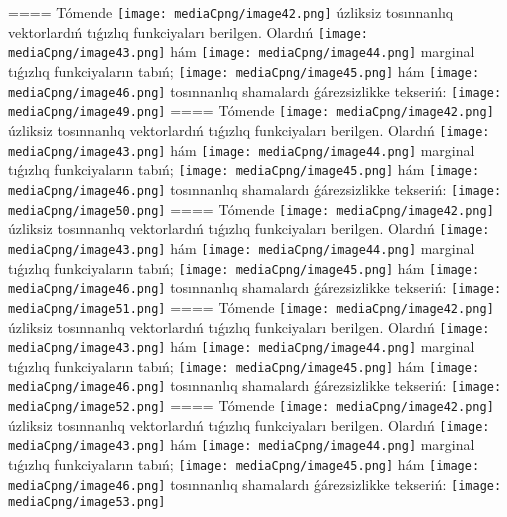 ====
Tómende \texttt{[image: mediaCpng/image42.png]} úzliksiz tosınnanlıq vektorlardıń tıǵızlıq funkciyaları berilgen. Olardıń \texttt{[image: mediaCpng/image43.png]} hám \texttt{[image: mediaCpng/image44.png]} marginal tıǵızlıq funkciyaların tabıń; \texttt{[image: mediaCpng/image45.png]} hám \texttt{[image: mediaCpng/image46.png]} tosınnanlıq shamalardı ǵárezsizlikke tekseriń: \texttt{[image: mediaCpng/image49.png]}
====
Tómende \texttt{[image: mediaCpng/image42.png]} úzliksiz tosınnanlıq vektorlardıń tıǵızlıq funkciyaları berilgen. Olardıń \texttt{[image: mediaCpng/image43.png]} hám \texttt{[image: mediaCpng/image44.png]} marginal tıǵızlıq funkciyaların tabıń; \texttt{[image: mediaCpng/image45.png]} hám \texttt{[image: mediaCpng/image46.png]} tosınnanlıq shamalardı ǵárezsizlikke tekseriń: \texttt{[image: mediaCpng/image50.png]}
====
Tómende \texttt{[image: mediaCpng/image42.png]} úzliksiz tosınnanlıq vektorlardıń tıǵızlıq funkciyaları berilgen. Olardıń \texttt{[image: mediaCpng/image43.png]} hám \texttt{[image: mediaCpng/image44.png]} marginal tıǵızlıq funkciyaların tabıń; \texttt{[image: mediaCpng/image45.png]} hám \texttt{[image: mediaCpng/image46.png]} tosınnanlıq shamalardı ǵárezsizlikke tekseriń: \texttt{[image: mediaCpng/image51.png]}
====
Tómende \texttt{[image: mediaCpng/image42.png]} úzliksiz tosınnanlıq vektorlardıń tıǵızlıq funkciyaları berilgen. Olardıń \texttt{[image: mediaCpng/image43.png]} hám \texttt{[image: mediaCpng/image44.png]} marginal tıǵızlıq funkciyaların tabıń; \texttt{[image: mediaCpng/image45.png]} hám \texttt{[image: mediaCpng/image46.png]} tosınnanlıq shamalardı ǵárezsizlikke tekseriń: \texttt{[image: mediaCpng/image52.png]}
====
Tómende \texttt{[image: mediaCpng/image42.png]} úzliksiz tosınnanlıq vektorlardıń tıǵızlıq funkciyaları berilgen. Olardıń \texttt{[image: mediaCpng/image43.png]} hám \texttt{[image: mediaCpng/image44.png]} marginal tıǵızlıq funkciyaların tabıń; \texttt{[image: mediaCpng/image45.png]} hám \texttt{[image: mediaCpng/image46.png]} tosınnanlıq shamalardı ǵárezsizlikke tekseriń: \texttt{[image: mediaCpng/image53.png]}
